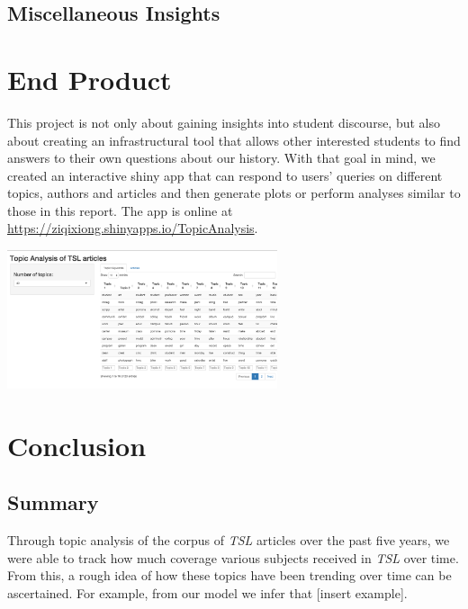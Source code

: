 \documentclass[a4paper]{article}
\begin{document}
\subsection{Miscellaneous Insights}

\section{End Product}
This project is not only about gaining insights into student discourse, but also about creating an infrastructural tool that allows other interested students to find answers to their own questions about our history. With that goal in mind, we created an interactive shiny app that can respond to users' queries on different topics, authors and articles and then generate plots or perform analyses similar to those in this report. The app is online at \href{https://ziqixiong.shinyapps.io/TopicAnalysis}{https://ziqixiong.shinyapps.io/TopicAnalysis}.
\vspace{1cm}

\includegraphics[width=300px]{shinydemo.png}

\section{Conclusion}

\subsection{Summary}
Through topic analysis of the corpus of \textit{TSL} articles over the past five years, we were able to track how much coverage various subjects received in \textit{TSL} over time. From this, a rough idea of how these topics have been trending over time can be ascertained. For example, from our model we infer that [insert example].
\end{document}

